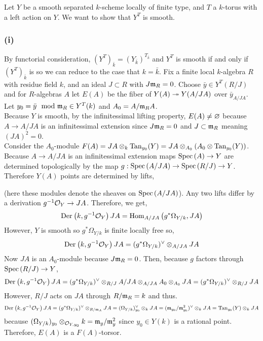 \documentclass[12pt]{article}
\begin{document}
Let $Y$ be a smooth separated $k$-scheme locally of finite type, and $T$ a $k$-torus with a left action on $Y$. We want to show that $Y^T$ is smooth.

\subsubsection{(i)}


By functorial consideration, $(Y^T)_{\bar{k}} = (Y_{\bar{k}})^{T_{\bar{k}}}$ and $Y^T$ is smooth if and only if $(Y^T)_{\bar{k}}$ is so we can reduce to the case that $k = \bar{k}$. Fix a finite local $k$-algebra $R$ with residue field $k$, and an ideal $J \subset R$ with $J \mathfrak{m}_R = 0$. Choose $\bar{y} \in Y^T(R/J)$ and for $R$-algebras $A$ let $E(A)$ be the fiber of $Y(A) \twoheadrightarrow Y(A/JA)$ over $\bar{y}_{A/JA}$. Let $y_0 = \bar{y} \mod {\mathfrak{m}}_R \in Y^T(k)$ and $A_0 = A / \mathfrak{m}_R A$.
\bigskip\\
Because $Y$ is smooth, by the infinitessimal lifting property, $E(A) \neq \varnothing$ because $A \to A / JA$ is an infinitessimal extension since $J \mathfrak{m}_R = 0$ and $J \subset \mathfrak{m}_R$ meaning $(JA)^2 = 0$.
\bigskip\\
Consider the $A_0$-module $F(A) = JA \otimes_k \mathrm{Tan}_{y_0}(Y) = JA \otimes_{A_0} (A_0 \otimes \mathrm{Tan}_{y_0}(Y))$. Because $A \to A/JA$ is an infinitessimal extension maps $\mathrm{Spec}\left( A \right) \to Y$ are determined topologically by the map $g : \mathrm{Spec}\left( A/JA \right) \to \mathrm{Spec}\left( R/J \right) \to Y$. Therefore  $Y(A)$ points are determined by lifts,
\begin{center}
\end{center}
(here these modules denote the sheaves on $\mathrm{Spec}\left( A/JA \right)$). Any two lifts differ by a derivation $g^{-1} \mathcal{O}_{Y} \to JA$. Therefore, we get,
\[ \mathrm{Der}_{} \left( k, g^{-1} \mathcal{O}_{Y} \right){JA} = \mathrm{Hom}_{A/JA} \left( g^* \Omega_{Y/k}, JA \right) \]
However, $Y$ is smooth so $g^* \Omega_{Y/k}$ is finite locally free so,
\[ \mathrm{Der}_{} \left( k, g^{-1} \mathcal{O}_{Y} \right){JA} = (g^* \Omega_{Y/k})^\vee \otimes_{A/JA} JA \]
Now $JA$ is an $A_0$-module because $J \mathfrak{m}_R = 0$. Then, because $g$ factors through $\mathrm{Spec}\left( R/J \right) \to Y$, 
\[ \mathrm{Der}_{} \left( k, g^{-1} \mathcal{O}_{Y} \right){JA} = (g^* \Omega_{Y/k})^\vee \otimes_{R/J} A/JA \otimes_{A/JA} A_0 \otimes_{A_0} JA = (g^* \Omega_{Y/k})^\vee \otimes_{R/J} JA \]
However, $R/J$ acts on $JA$ through $R/\mathfrak{m}_R = k$ and thus.
\[ \mathrm{Der}_{} \left( k, g^{-1} \mathcal{O}_{Y} \right){JA} = (g^* \Omega_{Y/k})^\vee \otimes_{R/\mathfrak{m}_A} JA = (\Omega_{Y/k})^\vee_{y_0} \otimes_k JA = (\mathfrak{m}_{y_0} / \mathfrak{m}_{y_0}^2)^\vee \otimes_k JA = \mathrm{Tan}_{y_0}(Y) \otimes_k JA \]
because $(\Omega_{Y/k})_{y_0} \otimes_{\mathcal{O}_{Y, y_0}} k = \mathfrak{m}_y / \mathfrak{m}_y^2$ since $y_0 \in Y(k)$ is a rational point. Therefore, $E(A)$ is a $F(A)$-torsor.
\end{document}
